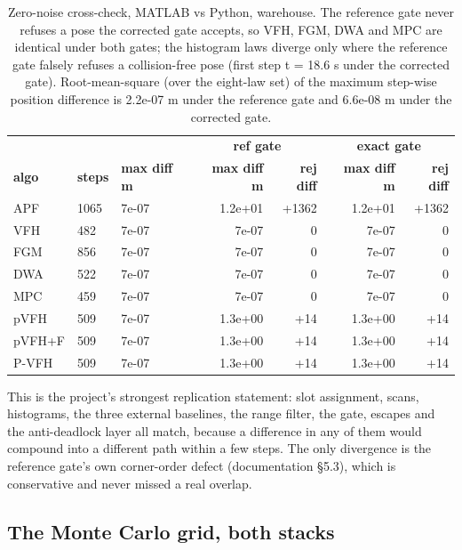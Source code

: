 \begin{table}[H]
\centering\footnotesize
\begin{tabular}{@{}lllrrrr@{}}
\toprule
& & & \multicolumn{2}{c}{\textbf{ref gate}} & \multicolumn{2}{c}{\textbf{exact gate}}\\
\textbf{algo} & \textbf{steps} & \textbf{max diff m} &
\textbf{max diff m} & \textbf{rej diff} & \textbf{max diff m} & \textbf{rej diff}\\
\midrule
APF & 1065 & 7e-07 & 1.2e+01 & +1362 & 1.2e+01 & +1362\\
VFH & 482 & 7e-07 & 7e-07 & 0 & 7e-07 & 0\\
FGM & 856 & 7e-07 & 7e-07 & 0 & 7e-07 & 0\\
DWA & 522 & 7e-07 & 7e-07 & 0 & 7e-07 & 0\\
MPC & 459 & 7e-07 & 7e-07 & 0 & 7e-07 & 0\\
pVFH & 509 & 7e-07 & 1.3e+00 & +14 & 1.3e+00 & +14\\
pVFH+F & 509 & 7e-07 & 1.3e+00 & +14 & 1.3e+00 & +14\\
P-VFH & 509 & 7e-07 & 1.3e+00 & +14 & 1.3e+00 & +14\\
\bottomrule
\end{tabular}
\caption{Zero-noise cross-check, MATLAB vs Python, warehouse. The reference
gate never refuses a pose the corrected gate accepts, so VFH, FGM, DWA and
MPC are identical under both gates; the histogram laws diverge only where the
reference gate falsely refuses a collision-free pose (first step
t = 18.6 s under the corrected gate). Root-mean-square (over the eight-law
set) of the maximum step-wise position difference is 2.2e-07 m under the
reference gate and 6.6e-08 m under the corrected gate.}
\label{tab:xcheck}
\end{table}

This is the project's strongest replication statement: slot assignment, scans,
histograms, the three external baselines, the range filter, the gate, escapes
and the anti-deadlock layer all match, because a difference in any of them
would compound into a different path within a few steps. The only
divergence is the reference gate's own corner-order defect (documentation
\S5.3), which is conservative and never missed a real overlap.

\subsection{The Monte Carlo grid, both stacks}
\label{sec:grid}

